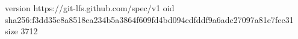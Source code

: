 version https://git-lfs.github.com/spec/v1
oid sha256:f3dd35e8a8518ea234b5a3864f609fd4bd094cdfddf9a6adc27097a81e7fec31
size 3712
